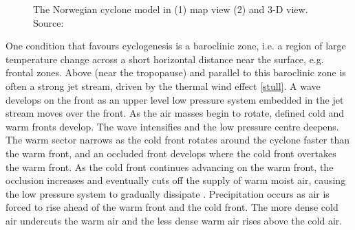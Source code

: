 \begin{figure}
	
	\caption{The Norwegian cyclone model in (1) map view (2) and 3-D view.  Source: \cite{norwegian}}\label{fig:norwegian_maps}
\end{figure}

One condition that favours cyclogenesis is a baroclinic zone, i.e. a region of large temperature change across a short horizontal distance near the surface, e.g. frontal zones. Above (near the tropopause) and parallel to this baroclinic zone is often a strong jet stream, driven by the thermal wind effect \ref{stull}. A wave develops on the front as an upper level low pressure system embedded in the jet stream moves over the front. As the air masses begin to rotate, defined cold and warm fronts develop. The wave intensifies and the low pressure centre deepens. The warm sector narrows as the cold front rotates around the cyclone faster than the warm front, and an occluded front develops where the cold front overtakes the warm front. As the cold front continues advancing on the warm front, the occlusion increases and eventually cuts off the supply of warm moist air, causing the low pressure system to gradually dissipate \citep{norwegian}. Precipitation occurs as air is forced to rise ahead of the warm front and the cold front. The more dense cold air undercuts the warm air and the less dense warm air rises above the cold air.

